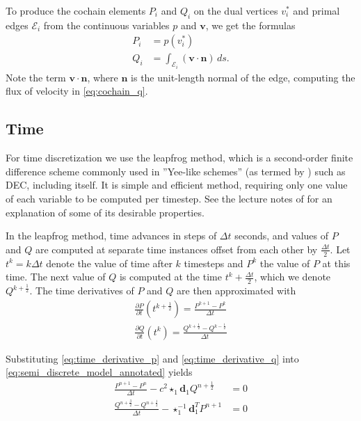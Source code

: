 \documentclass[utf8,english]{gradu3}
\begin{document}
To produce the cochain elements $P_i$ and $Q_i$
on the dual vertices $v_i^*$ and primal edges $\mathcal{E}_i$
from the continuous variables $p$ and $\mathbf{v}$,
we get the formulas
\begin{align}
  \label{eq:cochain_p}
  P_i &= p(v_i^*) \\
  \label{eq:cochain_q}
  Q_i &= \int_{\mathcal{E}_i} (\mathbf{v} \cdot \mathbf{n}) \,ds.
\end{align}
Note the term $\mathbf{v} \cdot \mathbf{n}$,
where $\mathbf{n}$ is the unit-length normal of the edge,
computing the flux of velocity in \eqref{eq:cochain_q}.


\subsection{Time}\label{sec:time_discr}

For time discretization we use the leapfrog method,
which is a second-order finite difference scheme
commonly used in ''Yee-like schemes''
(as termed by \textcite{rabina_numerical_2014}) such as DEC,
including \parencite{yee_numerical_1966} itself.
It is simple and efficient method,
requiring only one value of each variable to be computed per timestep.
See the lecture notes of \textcite{young_leapfrog_2014} for an explanation
of some of its desirable properties.

In the leapfrog method, time advances in steps of $\Delta t$ seconds,
and values of $P$ and $Q$ are computed at separate time instances
offset from each other by $\frac{\Delta t}{2}$.
Let $t^k = k\Delta t$ denote the value of time after $k$ timesteps
and $P^k$ the value of $P$ at this time.
The next value of $Q$ is computed at the time $t^k + \frac{\Delta t}{2}$,
which we denote $Q^{k+\frac{1}{2}}$.
The time derivatives of $P$ and $Q$ are then approximated with
\begin{eqnarray}
  \label{eq:time_derivative_p}
  \frac{\partial P}{\partial t}(t^{k+\frac{1}{2}}) = \frac{P^{k+1} - P^k}{\Delta t} \\
  \label{eq:time_derivative_q}
  \frac{\partial Q}{\partial t}(t^k) = \frac{Q^{k+\frac{1}{2}} - Q^{k-\frac{1}{2}}}{\Delta t}
\end{eqnarray}

Substituting \eqref{eq:time_derivative_p} and \eqref{eq:time_derivative_q}
into \eqref{eq:semi_discrete_model_annotated} yields
\begin{align*}
\frac{P^{n+1} - P^n}{\Delta t} - c^2 \star_1 \mathbf{d}_1 Q^{n+\frac{1}{2}} &= 0 \\
\frac{Q^{n+\frac{3}{2}} - Q^{n+\frac{1}{2}}}{\Delta t}
- \star_1^{-1} \mathbf{d}_1^T P^{n+1} &= 0 \\
\end{align*}
\end{document}
